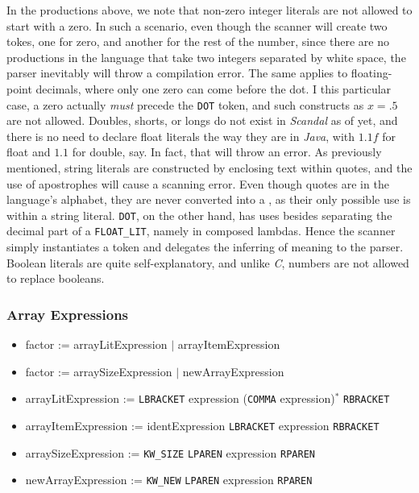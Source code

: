 In the productions above, we note that non-zero integer literals are not allowed to start with a zero. In such a scenario, even though the scanner will create two tokes, one for zero, and another for the rest of the number, since there are no productions in the language that take two integers separated by white space, the parser inevitably will throw a compilation error. The same applies to floating-point decimals, where only one zero can come before the dot. I this particular case, a zero actually \emph{must} precede the \texttt{DOT} token, and such constructs as $x = .5$ are not allowed. Doubles, shorts, or longs do not exist in \emph{Scandal} as of yet, and there is no need to declare float literals the way they are in \emph{Java}, with $1.1f$ for float and $1.1$ for double, say. In fact, that will throw an error. As previously mentioned, string literals are constructed by enclosing text within quotes, and the use of apostrophes will cause a scanning error. Even though quotes are in the language's alphabet, they are never converted into a , as their only possible use is within a string literal. \texttt{DOT}, on the other hand, has uses besides separating the decimal part of a \texttt{FLOAT\_LIT}, namely in composed lambdas. Hence the scanner simply instantiates a token and delegates the inferring of meaning to the parser. Boolean literals are quite self-explanatory, and unlike \emph{C}, numbers are not allowed to replace booleans.

\subsubsection{Array Expressions}

\begin{itemize}
	\item factor := arrayLitExpression $|$ arrayItemExpression
	\item factor := arraySizeExpression $|$ newArrayExpression
	\item arrayLitExpression := \texttt{LBRACKET} expression (\texttt{COMMA} expression)$^*$ \texttt{RBRACKET}
	\item arrayItemExpression := identExpression \texttt{LBRACKET} expression \texttt{RBRACKET}
	\item arraySizeExpression := \texttt{KW\_SIZE} \texttt{LPAREN} expression \texttt{RPAREN}
	\item newArrayExpression := \texttt{KW\_NEW} \texttt{LPAREN} expression \texttt{RPAREN}
\end{itemize}

